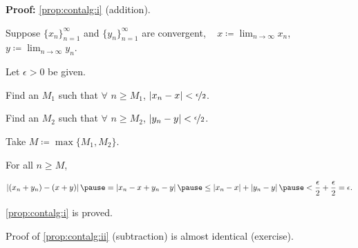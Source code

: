 \documentclass[10pt,aspectratio=169]{beamer}
\begin{document}
\begin{frame}

\textbf{Proof:}
\eqref{prop:contalg:i} (addition).

\pause
\medskip

Suppose $\{ x_n \}_{n=1}^\infty$ and $\{ y_n \}_{n=1}^\infty$ are convergent,
~
$\displaystyle x \coloneqq \lim_{n\to\infty} x_n$,
~
$\displaystyle y \coloneqq \lim_{n\to\infty} y_n$.

\pause
\medskip

Let $\epsilon > 0$ be given.  

\pause
Find an $M_1$ such that $\forall$ $n \geq M_1$,
$\left\lvert {x_n - x} \right\rvert < \nicefrac{\epsilon}{2}$.  

\pause
Find an $M_2$ such that $\forall$ $n \geq M_2$,
$\left\lvert {y_n - y} \right\rvert < \nicefrac{\epsilon}{2}$.

\pause
Take $M \coloneqq \max \{ M_1, M_2 \}$.

\pause
\medskip

For all $n \geq M$,

\pause
\medskip

$\displaystyle
\abs{(x_n+y_n) - (x+y)}
\pause
=
\abs{x_n-x + y_n-y}
\pause
\leq
\abs{x_n-x} + \abs{y_n-y}
\pause
<
\frac{\epsilon}{2} +
\frac{\epsilon}{2}
= \epsilon.
$

\medskip
\pause

\eqref{prop:contalg:i} is proved.

\medskip
\pause

Proof of \eqref{prop:contalg:ii} (subtraction) is almost identical
(exercise).

\end{frame}
\end{document}
